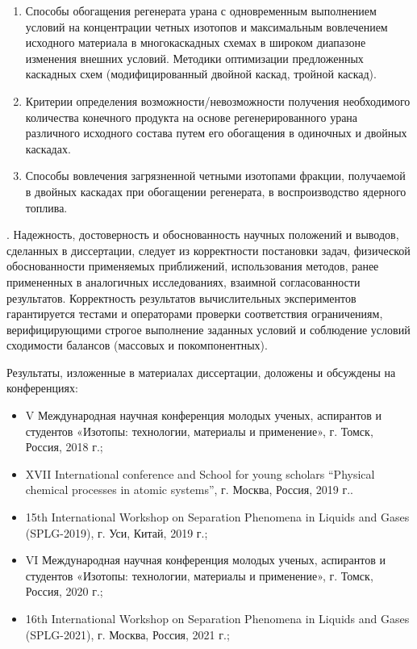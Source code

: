 \newpage
{}
\begin{enumerate}[leftmargin=0.5cm]
  \item Способы обогащения регенерата урана с одновременным выполнением условий на концентрации четных изотопов и максимальным вовлечением исходного материала в многокаскадных схемах в широком диапазоне изменения внешних условий. Методики оптимизации предложенных каскадных схем (модифицированный двойной каскад, тройной каскад).
  \item Критерии определения возможности/невозможности получения необходимого количества конечного продукта на основе регенерированного урана различного исходного состава путем его обогащения в одиночных и двойных каскадах.
  \item Способы вовлечения загрязненной четными изотопами фракции, получаемой в двойных каскадах при обогащении регенерата, в воспроизводство ядерного топлива.
\end{enumerate}

{\reliability}.
Надежность, достоверность и обоснованность научных положений и выводов, сделанных в диссертации, следует из корректности постановки задач, физической обоснованности применяемых приближений, использования методов, ранее примененных в аналогичных исследованиях, взаимной согласованности результатов. Корректность результатов вычислительных экспериментов гарантируется тестами и операторами проверки соответствия ограничениям, верифицирующими строгое выполнение заданных условий и соблюдение условий сходимости балансов (массовых и покомпонентных).

{\probation}
Результаты, изложенные в материалах диссертации, доложены и обсуждены на конференциях:
\begin{itemize}[leftmargin=0.4cm]
  \item V Международная научная конференция молодых ученых, аспирантов и студентов «Изотопы: технологии, материалы и применение», г. Томск, Россия, 2018 г.;
  \item XVII International conference and School for young scholars “Physical chemical processes in atomic systems”, г. Москва, Россия, 2019 г..
  \item 15th International Workshop on Separation Phenomena in Liquids and Gases (SPLG-2019), г. Уси, Китай, 2019 г.;
  \item VI Международная научная конференция молодых ученых, аспирантов и студентов «Изотопы: технологии, материалы и применение», г. Томск, Россия, 2020 г.;
  \item 16th International Workshop on Separation Phenomena in Liquids and Gases (SPLG-2021), г. Москва, Россия, 2021 г.;
\end{itemize}

